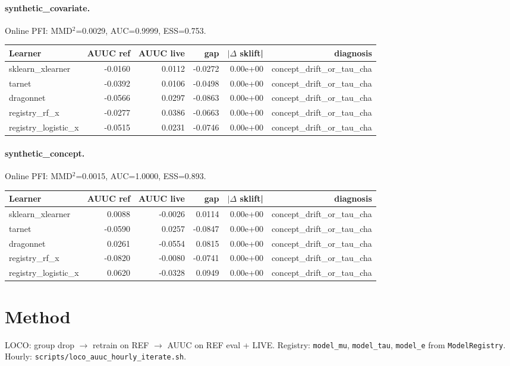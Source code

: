 \documentclass[11pt]{article}
\begin{document}
\paragraph{synthetic\_covariate.} Online PFI: MMD$^2$=0.0029, AUC=0.9999, ESS=0.753.
\begin{tabular}{lrrrrr}
\toprule Learner & AUUC ref & AUUC live & gap & $|\Delta$ sklift| & diagnosis \\
\midrule
sklearn\_xlearner & -0.0160 & 0.0112 & -0.0272 & 0.00e+00 & concept_drift_or_tau_cha \\
tarnet & -0.0392 & 0.0106 & -0.0498 & 0.00e+00 & concept_drift_or_tau_cha \\
dragonnet & -0.0566 & 0.0297 & -0.0863 & 0.00e+00 & concept_drift_or_tau_cha \\
registry\_rf\_x & -0.0277 & 0.0386 & -0.0663 & 0.00e+00 & concept_drift_or_tau_cha \\
registry\_logistic\_x & -0.0515 & 0.0231 & -0.0746 & 0.00e+00 & concept_drift_or_tau_cha \\
\bottomrule\end{tabular}
\paragraph{synthetic\_concept.} Online PFI: MMD$^2$=0.0015, AUC=1.0000, ESS=0.893.
\begin{tabular}{lrrrrr}
\toprule Learner & AUUC ref & AUUC live & gap & $|\Delta$ sklift| & diagnosis \\
\midrule
sklearn\_xlearner & 0.0088 & -0.0026 & 0.0114 & 0.00e+00 & concept_drift_or_tau_cha \\
tarnet & -0.0590 & 0.0257 & -0.0847 & 0.00e+00 & concept_drift_or_tau_cha \\
dragonnet & 0.0261 & -0.0554 & 0.0815 & 0.00e+00 & concept_drift_or_tau_cha \\
registry\_rf\_x & -0.0820 & -0.0080 & -0.0741 & 0.00e+00 & concept_drift_or_tau_cha \\
registry\_logistic\_x & 0.0620 & -0.0328 & 0.0949 & 0.00e+00 & concept_drift_or_tau_cha \\
\bottomrule\end{tabular}
\section{Method}
LOCO: group drop $\rightarrow$ retrain on REF $\rightarrow$ AUUC on REF eval + LIVE.
Registry: \texttt{model\_mu}, \texttt{model\_tau}, \texttt{model\_e} from \texttt{ModelRegistry}.
Hourly: \texttt{scripts/loco\_auuc\_hourly\_iterate.sh}.
\end{document}
